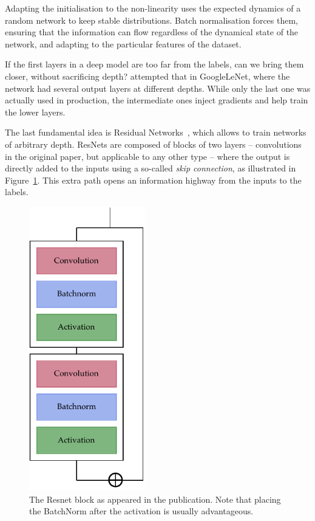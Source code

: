 Adapting the initialisation  to the non-linearity uses the expected dynamics of a random network to keep stable distributions.
Batch normalisation forces them, ensuring that the information can flow regardless of the dynamical state of the network, and adapting to the particular features of the dataset.

If the first layers  in a deep model are
too far from the labels, can we bring them closer, without sacrificing depth?
\citet{googlenet} attempted that in GoogleLeNet, where the network had several output layers at different depths.
While only the last one was actually used in production, the intermediate ones inject gradients and help train the lower layers.

The last fundamental idea  is Residual Networks~\citep{resnet}, which allows to train networks of arbitrary depth.
ResNets are composed of blocks of two layers  -- convolutions in the original paper, but applicable to any other type -- where the output is directly added to the inputs using a so-called \emph{skip connection}, as illustrated in Figure~\ref{fig:resnet}.
This extra path opens an information highway from the inputs to the labels.

\begin{figure}[!htb]
	\centering
	\includegraphics[width=0.45\textwidth]{machine_learning/figures/resnet}
	\caption{The Resnet block as appeared in the publication.
	Note that placing the BatchNorm after the activation is usually advantageous.}\label{fig:resnet}
\end{figure}

